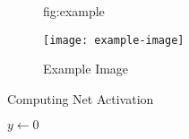 \documentclass{midl} %
\begin{document}
\begin{figure}[htbp]
\floatconts
  {fig:example}
  {\caption{Example Image}}
  {\texttt{[image: example-image]}}
\end{figure}

\begin{algorithm2e}
\caption{Computing Net Activation}
\label{alg:net}
{}
$y\leftarrow 0$\;
\end{algorithm2e}



\end{document}
